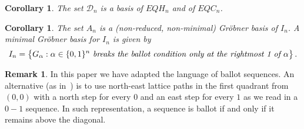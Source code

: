 \documentclass[11pt,oneside]{amsart}
\newtheorem{cor}[theorem]{Corollary}
\theoremstyle{definition}
\newtheorem{remark}[theorem]{Remark}
\numberwithin{equation}{section}
\begin{document}
\begin{cor} The set ${\mathcal D}_n$ is a basis of $EQH_n$ and of $EQC_n$.
\end{cor}

\begin{cor}\label{cor:minimalGB}
The set $A_n$ is a (non-reduced, non-minimal) Gr\"obner basis of $I_n$. A minimal Gr\"obner basis for $I_n$ is given by
$$ I_n =\big\{ G_\alpha : \alpha \in \{0,1\}^n \text{ \it breaks the ballot condition only
at the rightmost  1 of }  \alpha\big\}\,.
$$
\end{cor}

\begin{remark} In this paper we have adapted the language of ballot sequences. An alternative (as in~\cite{B,AB}) is to use north-east lattice paths in the first quadrant from $(0,0)$ with
a north step for every $0$ and an east step  for every  $1$ as we read in a $0-1$ sequence. In such representation, a sequence is ballot if and only if it remains above
the diagonal.
\end{remark}

\vskip 1in
\end{document}
